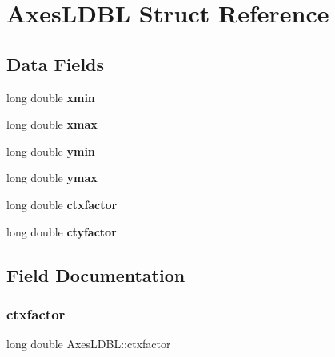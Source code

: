 \hypertarget{struct_axes_l_d_b_l}{}\section{Axes\+L\+D\+BL Struct Reference}
\label{struct_axes_l_d_b_l}
\subsection*{Data Fields}
\begin{DoxyCompactItemize}
\item 
\mbox{\label{struct_axes_l_d_b_l_afc9c7ac423766c37e2a1cb9cb0eb2fe3}} 
long double {\bfseries xmin}
\item 
\mbox{\label{struct_axes_l_d_b_l_ad46da7b8b982c14b58f175edc4c1183b}} 
long double {\bfseries xmax}
\item 
\mbox{\label{struct_axes_l_d_b_l_a423f22c476736f8a1627063acbfc0426}} 
long double {\bfseries ymin}
\item 
\mbox{\label{struct_axes_l_d_b_l_a3b8e7a88acc56b5173a005ff29b6834f}} 
long double {\bfseries ymax}
\item 
\mbox{\label{struct_axes_l_d_b_l_ac115fcf200bdfa1962909809c5c8977f}} 
long double {\bfseries ctxfactor}
\item 
\mbox{\label{struct_axes_l_d_b_l_a1ae48fd4b64be2a22c19c50d572cefea}} 
long double {\bfseries ctyfactor}
\end{DoxyCompactItemize}


\subsection{Field Documentation}
\mbox{\label{struct_axes_l_d_b_l_ac115fcf200bdfa1962909809c5c8977f}} 
\subsubsection{\texorpdfstring{ctxfactor}{ctxfactor}}
{\footnotesize\ttfamily long double Axes\+L\+D\+B\+L\+::ctxfactor}

